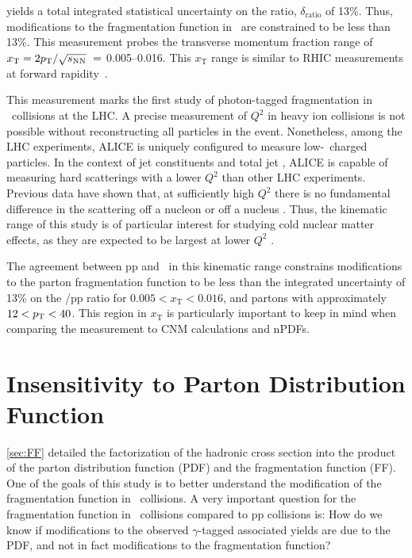 yields a total integrated statistical uncertainty on the ratio, $\delta_\mathrm{ratio}$ of 13\%. Thus, modifications to the fragmentation function in \pPb~are constrained to be less than 13\%. This measurement probes the transverse momentum fraction range of {$x_{\mathrm{T}} = 2\pt/\sqrt{s_{\mathrm{NN}}}\ = $ 0.005--0.016}. This $x_{\mathrm{T}}$ range is similar to RHIC measurements at forward rapidity~\cite{Adare:2011sc}.

This measurement marks the first study of photon-tagged fragmentation in \pPb~collisions at the LHC. A precise measurement of $Q^2$ in heavy ion collisions is not possible without reconstructing all particles in the event. Nonetheless, among the LHC experiments, ALICE is uniquely configured to measure low-\pt~charged particles. In the context of jet constituents and total jet \pt, ALICE is capable of measuring hard scatterings with a lower $Q^{2}$ than other LHC experiments. Previous data have shown that, at sufficiently high $Q^2$ there is no fundamental difference in the scattering off a nucleon or off a nucleus \cite{epps16:2017,ALTARELLI1977298}. Thus, the kinematic range of this study is of particular interest for studying cold nuclear matter effects, as they are expected to be largest at lower $Q^{2}$ \cite{epps16:2017}. 

The agreement between pp and \pPb~in this kinematic range constrains modifications to the parton fragmentation function to be less than the integrated uncertainty of 13\% on the \pPb/pp ratio for $ 0.005 < x_{\mathrm{T}} < 0.016$, and partons with approximately $12 < p_{\mathrm{T}} < 40$\GeVc. This region in $x_\mathrm{T}$ is particularly important to keep in mind when comparing the measurement to CNM calculations and nPDFs.

\section{Insensitivity to Parton Distribution Function}
\label{sec:insensitivity}
\ref{sec:FF} detailed the factorization of the hadronic cross section into the product of the parton distribution function (PDF) and the fragmentation function (FF). One of the goals of this study is to better understand the modification of the fragmentation function in \pPb~collisions. A very important question for the fragmentation function in \pPb~collisions compared to pp collisions is: How do we know if modifications to the observed $\gamma$-tagged associated yields are due to the PDF, and not in fact modifications to the fragmentation function?

